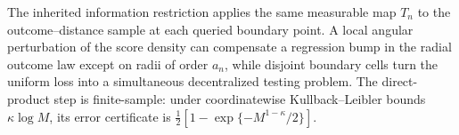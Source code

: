 The inherited information restriction applies the same measurable map \(T_n\) to the outcome--distance sample at each queried boundary point.  A local angular perturbation of the score density can compensate a regression bump in the radial outcome law except on radii of order \(a_n\), while disjoint boundary cells turn the uniform loss into a simultaneous decentralized testing problem.  The direct-product step is finite-sample: under coordinatewise Kullback--Leibler bounds \(\kappa\log M\), its error certificate is \(\frac12[1-\exp\{-M^{1-\kappa}/2\}]\).